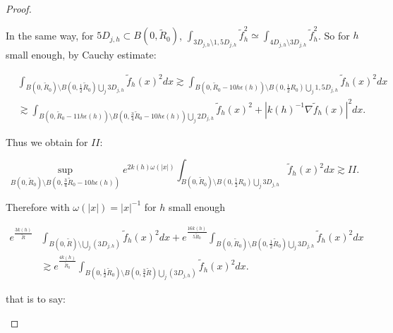 \documentclass[leqno,11pt,letterpaper, english]{amsart}
\newcommand{\nn}{\nonumber}
\theoremstyle{plain}
\theoremstyle{definition}
\numberwithin{equation}{section}
\begin{document}
\begin{proof}
\begin{itemize}
			In the same way, for $5D_{j,h}\subset B(0,\tilde{R}_0)$, $\int_{3D_{j,h}\setminus 1,5D_{j,h}}\tilde{f}_h^2\simeq \int_{4D_{j,h}\setminus 3D_{j,h}}\tilde{f}_h^2$. So for $h$ small enough, by Cauchy estimate:
			
			\begin{align}
				&\int_{B(0,\tilde{R}_0)\setminus B(0,\frac{1}{2}\tilde{R}_0)\bigcup_j 3D_{j,h}} \tilde{f}_h(x)^2dx\gtrsim\int_{B(0,\tilde{R}_0-10h\epsilon(h))\setminus B(0,\frac{1}{2}R_0)\bigcup_j 1,5D_{j,h}} \tilde{f}_h(x)^2dx\nn\\
				&\gtrsim \int_{B(0,\tilde{R}_0-11h\epsilon(h))\setminus B(0,\frac{3}{4}\tilde{R}_0-10h\epsilon(h))\bigcup_j 2D_{j,h}}\tilde{f}_h(x)^2 +|k(h)^{-1}\nabla \tilde{f}_h(x)|^2dx.
			\end{align}
			
			Thus we obtain for $II$:
			
			\begin{equation}
			\sup_{B(0,\tilde{R}_0)\setminus B(0,\frac{3}{4}\tilde{R}_0-10h\epsilon(h))}e^{2k(h)\omega(|x|)}	\int_{B(0,\tilde{R}_0)\setminus B(0,\frac{1}{2}R_0)\bigcup_j 3D_{j,h}} \tilde{f}_h(x)^2dx\gtrsim II.
			\end{equation}
			
			Therefore with $\omega(|x|)=|x|^{-1}$ for $h$ small enough
			
			\begin{align}
			e^{\frac{3k(h)}{\tilde{R}}}&	\int_{B(0,\tilde{R})\setminus \bigcup_j(3D_{j,h})} \tilde{f}_h(x)^2dx+e^{\frac{16k(h)}{5\tilde{R}_0}} \int_{B(0,\tilde{R}_0)\setminus B(0,\frac{1}{2}\tilde{R}_0)\bigcup_j 3D_{j,h}} \tilde{f}_h(x)^2dx\nn\\
			&\gtrsim e^{\frac{4k(h)}{\tilde{R}_0}} \int_{B(0,\frac{1}{2}\tilde{R}_0)\setminus  B(0,\frac{3}{4}\tilde{R})\bigcup_j(3D_{j,h})} \tilde{f}_h(x)^2dx .
			\end{align}
			
			that is to say:
			

\end{itemize}
\end{proof}
\end{document}
